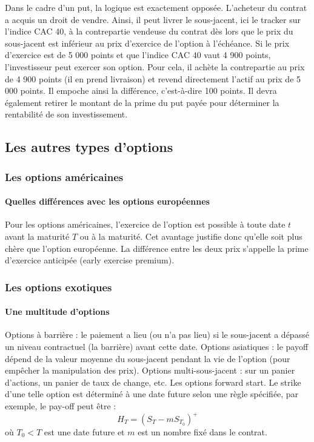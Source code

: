 \documentclass[a4paper, 12pt]{report}
\begin{document}
Dans le cadre d’un put, la logique est exactement opposée. L’acheteur du contrat a acquis un droit de vendre. Ainsi, il peut livrer le sous-jacent, ici le tracker sur l’indice CAC 40, à la contrepartie vendeuse du contrat dès lors que le prix du sous-jacent est inférieur au prix d’exercice de l’option à l’échéance. Si le prix d’exercice est de 5 000 points et que l’indice CAC 40 vaut 4 900 points, l’investisseur peut exercer son option. Pour cela, il achète la contrepartie au prix de 4 900 points (il en prend livraison) et revend directement l’actif au prix de 5 000 points. Il empoche ainsi la différence, c’est-à-dire 100 points. Il devra également retirer le montant de la prime du put payée pour déterminer la rentabilité de son investissement.

\subsection{Les autres types d'options}

\subsubsection{Les options américaines}

\paragraph{Quelles différences avec les options européennes}

Pour les options américaines, l’exercice de l’option est possible à toute date \( t \) avant la maturité \( T \) ou à la maturité. Cet avantage justifie donc qu’elle soit plus chère que l’option européenne. La différence entre les deux prix s’appelle la prime d’exercice anticipée (early exercise premium).

\subsubsection{Les options exotiques}

\paragraph{Une multitude d’options}

Options à barrière : le paiement a lieu (ou n’a pas lieu) si le sous-jacent a dépassé un niveau contractuel (la barrière) avant cette date. Options asiatiques : le payoff dépend de la valeur moyenne du sous-jacent pendant la vie de l’option (pour empêcher la manipulation des prix). Options multi-sous-jacent : sur un panier d’actions, un panier de taux de change, etc. Les options forward start. Le strike d’une telle option est déterminé à une date future selon une règle spécifiée, par exemple, le pay-off peut être : 
\[
H_T = (S_T - mS_{T_0})^+ 
\]
où \( T_0 < T \) est une date future et \( m \) est un nombre fixé dans le contrat.
\end{document}
